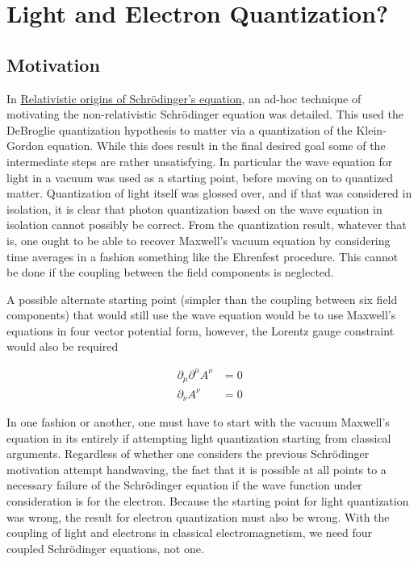 

\chapter{Light and Electron Quantization?}
\label{chap:lightQuantize}
\date{July 2, 2009}


\beginArtWithToc

\section{Motivation}

In \href{http://sites.google.com/site/peeterjoot/math2009/relwave.pdf}{Relativistic origins of Schr\"odinger's equation}, an ad-hoc technique of motivating the non-relativistic Schr\"odinger equation was detailed.  This used the DeBroglie quantization hypothesis to matter via a quantization of the Klein-Gordon equation.  While this  does result in the final desired goal some of the intermediate steps are rather unsatisfying.  In particular the wave equation for light in a vacuum was used as a starting point, before moving on to quantized matter.  Quantization of light itself was glossed over, and if that was considered in isolation, it is clear that photon quantization based on the wave equation in isolation cannot possibly be correct.  From the quantization result, whatever that is, one ought to be able to recover Maxwell's vacuum equation by considering time averages in a fashion something like the Ehrenfest procedure.  This cannot be done if the coupling between the field components is neglected.

A possible alternate starting point (simpler than the coupling between six field components) that would still use the wave equation would be to use Maxwell's equations in four vector potential form, however, the Lorentz gauge constraint would also be required

\begin{align}\label{eqn:maxwellPotVacuum}
\partial_\mu \partial^\mu A^\nu &= 0 \\
\partial_\nu A^\nu &= 0
\end{align}

In one fashion or another, one must have to start with the vacuum Maxwell's equation in its entirely if attempting light quantization starting from classical arguments.  Regardless of whether one considers the previous Schr\"odinger motivation attempt handwaving, the fact that it is possible at all points to a necessary failure of the Schr\"odinger equation if the wave function under consideration is for the electron.  Because the starting point for light quantization was wrong, the result for electron quantization must also be wrong.  With the coupling of light and electrons in classical electromagnetism, we need four coupled Schr\"odinger equations, not one.

